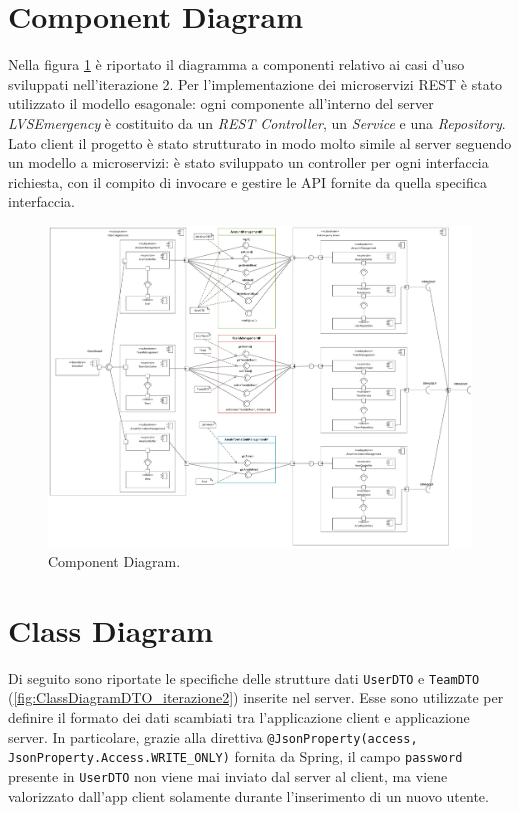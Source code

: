 \section{Component Diagram}
Nella figura \ref{fig:ComponentDiagram_iterazione2} è riportato il diagramma a componenti relativo ai casi d'uso sviluppati nell'iterazione 2. Per l'implementazione dei microservizi REST è stato utilizzato il modello esagonale: ogni componente all'interno del server \textit{LVSEmergency} è costituito da un \textit{REST Controller}, un \textit{Service} e una \textit{Repository}.
Lato client il progetto è stato strutturato in modo molto simile al server seguendo un modello a microservizi: è stato sviluppato un controller per ogni interfaccia richiesta, con il compito di invocare e gestire le API fornite da quella specifica interfaccia. 

\begin{figure}[h!]
	\centering
	\includegraphics[width=1\linewidth]{./Iterazione 2/OtherFiles/UML - Component View}
	\caption{Component Diagram.}
	\label{fig:ComponentDiagram_iterazione2}
\end{figure}

\clearpage

\section{Class Diagram}
Di seguito sono riportate le specifiche delle strutture dati \texttt{UserDTO} e \texttt{TeamDTO} (\Fig\ref{fig:ClassDiagramDTO_iterazione2}) inserite nel server. Esse sono utilizzate per definire il formato dei dati scambiati tra l'applicazione client e applicazione server. In particolare, grazie alla direttiva \texttt{@JsonProperty(access, JsonProperty.Access.WRITE\_ONLY)} fornita da Spring, il campo \texttt{password} presente in \texttt{UserDTO} non viene mai inviato dal server al client, ma viene valorizzato dall'app client solamente durante l'inserimento di un nuovo utente.  

